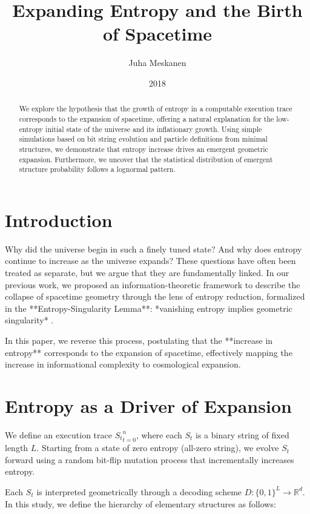 \documentclass[11pt]{article}
\title{Expanding Entropy and the Birth of Spacetime}
\author{Juha Meskanen}
\date{2018}
\begin{document}
\maketitle


\begin{abstract}
   We explore the hypothesis that the growth of entropy in a computable execution trace corresponds to the expansion of spacetime,
   offering a natural explanation for the low-entropy initial state of the universe and its inflationary growth. Using simple simulations
   based on bit string evolution and particle definitions from minimal structures, we demonstrate that entropy
   increase drives an emergent geometric expansion. Furthermore, we uncover that the statistical distribution of emergent
   structure probability follows a lognormal pattern.
\end{abstract}

\section{Introduction}

Why did the universe begin in such a finely tuned state? And why does entropy continue to increase as the universe expands?
These questions have often been treated as separate, but we argue that they are fundamentally linked.
In our previous work, we proposed an information-theoretic framework to describe the collapse of spacetime geometry through
the lens of entropy reduction, formalized in the **Entropy-Singularity Lemma**: *vanishing entropy implies geometric
singularity* \cite{Paper1}.

In this paper, we reverse this process, postulating that the **increase in entropy** corresponds to the expansion of spacetime,
effectively mapping the increase in informational complexity to cosmological expansion.


\section{Entropy as a Driver of Expansion}

We define an execution trace ${S_t}_{t=0}^n$, where each $S_t$ is a binary string of fixed length $L$.
Starting from a state of zero entropy (all-zero string), we evolve $S_t$ forward using a random bit-flip mutation process that
incrementally increases entropy.

Each $S_t$ is interpreted geometrically through a decoding scheme $D: \{0,1\}^L \to \mathbb{R}^d$. In this study,
we define the hierarchy of elementary structures as follows:
\end{document}
